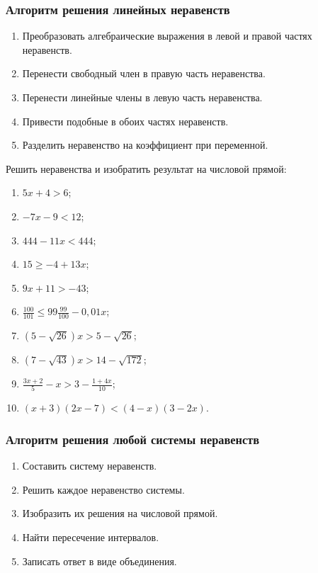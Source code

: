 \documentclass[algebra,a5paper]{pum}
\date{10.04.20}
\begin{document}
\subsubsection*{Алгоритм решения линейных неравенств}
\begin{enumerate}[nosep]
  \item Преобразовать алгебраические выражения в левой и правой частях неравенств.
  \item Перенести свободный член в правую часть неравенства.
  \item Перенести линейные члены в левую часть неравенства.
  \item Привести подобные в обоих частях неравенств.
  \item Разделить неравенство на коэффициент при переменной.
\end{enumerate}

\begin{exercises}
  \begin{question}
    Решить неравенства и изобратить результат на числовой прямой:
    \begin{multicols}{2}
      \begin{enumerate}[label=\arabic*)]
        \item $5x+4>6$;
        \item $-7x-9<12$;
        \item $444-11x<444$;
        \item $15\ge-4+13x$;
        \item $9x+11>-43$;
        \item $\frac{100}{101}\le99\frac{99}{100}-0,01x$;
        \item $(5-\sqrt{26})x>5-\sqrt{26}$;
        \item $(7-\sqrt{43})x>14-\sqrt{172}$;
        \item $\frac{3x+2}{5}-x>3-\frac{1+4x}{10}$;
        \item $(x+3)(2x-7)<(4-x)(3-2x)$.
      \end{enumerate}
    \end{multicols}
  \end{question}
\end{exercises}

\subsubsection*{Алгоритм решения любой системы неравенств}
\begin{enumerate}[nosep]
  \item Составить систему неравенств.
  \item Решить каждое неравенство системы.
  \item Изобразить их решения на числовой прямой.
  \item Найти пересечение интервалов.
  \item Записать ответ в виде объединения.
\end{enumerate}
\end{document}
